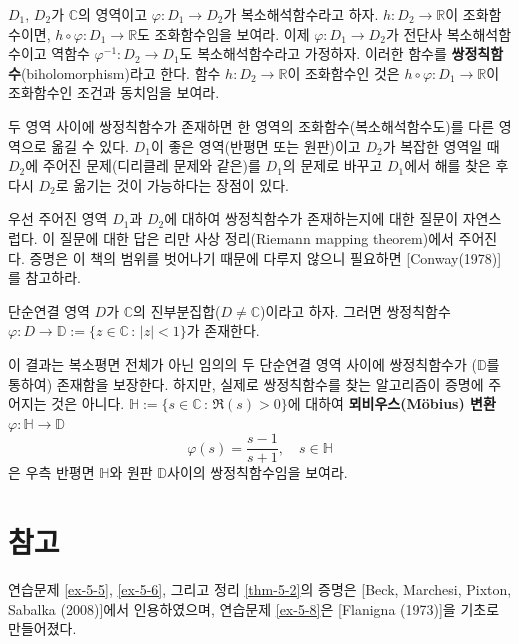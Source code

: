 \begin{salt_exercise}\label{ex-5-11}
$D_1$, $D_2$가 $\mathbb C$의 영역이고
$\varphi: D_1 \to D_2$가 복소해석함수라고 하자.
$h:D_2\to \mathbb R$이 조화함수이면,
$h\circ \varphi : D_1 \to \mathbb R$도 조화함수임을 보여라.
이제 $\varphi: D_1 \to D_2$가 전단사 복소해석함수이고
역함수 $\varphi^{-1}: D_2 \to D_1$도 복소해석함수라고 가정하자.
이러한 함수를 {\bf 쌍정칙함수}(biholomorphism)라고 한다.
함수 $h:D_2\to \mathbb R$이 조화함수인 것은
$h\circ \varphi : D_1 \to \mathbb R$이 조화함수인 조건과 동치임을 보여라.

두 영역 사이에 쌍정칙함수가 존재하면
한 영역의 조화함수(복소해석함수도)를 다른 영역으로 옮길 수 있다.
$D_1$이 좋은 영역(반평면 또는 원판)이고 $D_2$가 복잡한 영역일 때
$D_2$에 주어진 문제(디리클레 문제와 같은)를 $D_1$의 문제로 바꾸고
$D_1$에서 해를 찾은 후 다시 $D_2$로 옮기는 것이 가능하다는 장점이 있다.

우선 주어진 영역 $D_1$과 $D_2$에 대하여
쌍정칙함수가 존재하는지에 대한 질문이 자연스럽다.
이 질문에 대한 답은 리만 사상 정리(Riemann mapping theorem)에서 주어진다.
증명은 이 책의 범위를 벗어나기 때문에 다루지 않으니
필요하면 [Conway(1978)]를 참고하라.


\begin{salttheorem}[리만 사상 정리]{}{} \label{thm-5-5}
 단순연결 영역 $D$가 $\mathbb C$의 진부분집합($D\ne \mathbb C$)이라고 하자.
 그러면 쌍정칙함수 $\varphi: D\to \mathbb D:=\{z\in\mathbb C\,:\, |z|<1\}$가
 존재한다.
\end{salttheorem}

이 결과는 복소평면 전체가 아닌 임의의 두 단순연결 영역 사이에
쌍정칙함수가 ($\mathbb D$를 통하여) 존재함을 보장한다. 
하지만, 실제로 쌍정칙함수를 찾는 알고리즘이 증명에 주어지는 것은 아니다.
$\mathbb H:= \{s\in\mathbb C\,:\, \Re(s) >0 \}$에 대하여
{\bf 뫼비우스(M\"obius) 변환} $\varphi: \mathbb H \to \mathbb D$
\[ 
\varphi(s) = \dfrac{s-1}{s+1},
\quad s\in \mathbb H
\]
은 우측 반평면 $\mathbb H$와 원판  $\mathbb D$사이의 쌍정칙함수임을 보여라.
\end{salt_exercise}

\section{참고}

연습문제 \ref{ex-5-5}, \ref{ex-5-6}, 그리고 정리 \ref{thm-5-2}의 증명은
[Beck, Marchesi, Pixton, Sabalka (2008)]에서 인용하였으며,
연습문제 \ref{ex-5-8}은 [Flanigna (1973)]을 기초로 만들어졌다.


